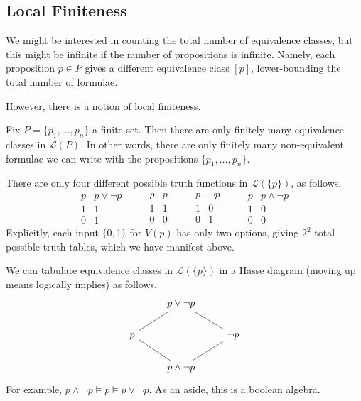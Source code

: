 \documentclass[../notes.tex]{subfiles}
\begin{document}
\subsection{Local Finiteness}
We might be interested in counting the total number of equivalence classes, but this might be infinite if the number of propositions is infinite. Namely, each proposition $p\in P$ gives a different equivalence class $[p]$, lower-bounding the total number of formulae.

However, there is a notion of local finiteness.
\begin{proposition} \label{prop:localfiniteness}
	Fix $P=\{p_1,\ldots,p_n\}$ a finite set. Then there are only finitely many equivalence classes in $\mathcal L(P)$. In other words, there are only finitely many non-equivalent formulae we can write with the propositions $\{p_1,\ldots,p_n\}$.
\end{proposition}
\begin{example}
	There are only four different possible truth functions in $\mathcal L(\{p\})$, as follows.
	\[\begin{array}{c|c}
		p & p\lor\lnot p \\
		\hline
		1 & 1 \\
		0 & 1
	\end{array}\qquad\begin{array}{c|c}
		p & p \\
		\hline
		1 & 1 \\
		0 & 0
	\end{array}\qquad\begin{array}{c|c}
		p & \lnot p \\
		\hline
		1 & 0 \\
		0 & 1
	\end{array}\qquad\begin{array}{c|c}
		p & p\land\lnot p \\
		\hline
		1 & 0 \\
		0 & 0
	\end{array}\]
	Explicitly, each input $\{0,1\}$ for $V(p)$ has only two options, giving $2^2$ total possible truth tables, which we have manifest above.
\end{example}
\begin{remark}
	We can tabulate equivalence classes in $\mathcal L(\{p\})$ in a Hasse diagram (moving up means logically implies) as follows.
	\[\begin{tikzcd}
		& {p\lor\lnot p} \\
		p && {\lnot p} \\
		& {p\land\lnot p}
		\arrow[no head, from=3-2, to=2-1]
		\arrow[no head, from=2-1, to=1-2]
		\arrow[no head, from=3-2, to=2-3]
		\arrow[no head, from=2-3, to=1-2]
	\end{tikzcd}\]
	For example, $p\land\lnot p\models p\models p\lor\lnot p$. As an aside, this is a boolean algebra.
\end{remark}
\end{document}
